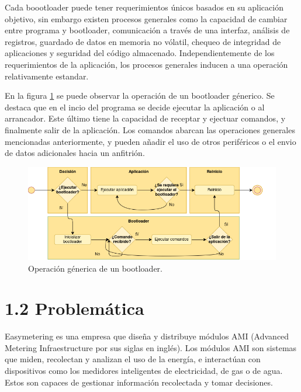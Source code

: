 \documentclass[
11pt, %
]{charter}
\begin{document}
Cada boootloader puede tener requerimientos únicos basados en su aplicación objetivo, sin embargo existen procesos generales como la capacidad de cambiar entre programa y bootloader, comunicación a través de una interfaz, análisis de registros, guardado de datos en memoria no vólatil, chequeo de integridad de aplicaciones y seguridad del código almacenado. Independientemente de los requerimientos de la aplicación, los procesos generales inducen a una operación relativamente estandar.

En la figura \ref{fig:bootloaderFlow} se puede observar la operación de un bootloader génerico. Se destaca que en el incio del programa se decide ejecutar la aplicación o al arrancador. Este último tiene la capacidad de receptar y ejectuar comandos, y finalmente salir de la aplicación. Los comandos abarcan las operaciones generales mencionadas anteriormente, y pueden añadir el uso de otros periféricos o el envio de datos adicionales hacia un anfitrión.

\begin{figure}[htpb]
\centering 
\includegraphics[width=.99\textwidth]{./Figuras/GdP-diagrams-bootloader.png}
\caption{Operación génerica de un bootloader.}
\label{fig:bootloaderFlow}
\end{figure}

\newpage

\section{1.2 Problemática}
\label{sec:s1Problematica}

Easymetering es una empresa que diseña y distribuye módulos AMI (Advanced Metering Infraestructure por sus siglas en inglés). Los módulos AMI son sistemas que miden, recolectan y analizan el uso de la energía, e interactúan con dispositivos como los medidores inteligentes de electricidad, de gas o de agua. Estos son capaces de gestionar información recolectada y tomar decisiones.
\end{document}
